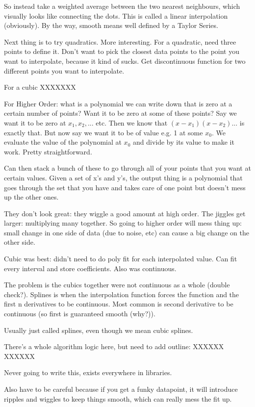\documentclass[12pt]{article}
\begin{document}
So instead take a weighted average between the two nearest neighbours, which visually looks like connecting the dots.
This is called a linear interpolation (obviously).
By the way, smooth means well defined by a Taylor Series.

Next thing is to try quadratics. More interesting.
For a quadratic, need three points to define it. Don't want to pick the closest data points to the point you want to interpolate, because it kind of sucks.
Get discontinuous function for two different points you want to interpolate.

For a cubic XXXXXXX


For Higher Order: what is a polynomial we can write down that is zero at a certain number of points?
Want it to be zero at some of these points? Say we want it to be zero at ${x_1, x_2,...}$ etc.
Then we know that $(x-x_1)(x-x_2)...$ is exactly that.
But now say we want it to be of value e.g. 1 at some $x_0$. We evaluate the value of the polynomial at $x_0$
and divide by its value to make it work. Pretty straightforward.

Can then stack a bunch of these to go through all of your points that you want at certain values.
Given a set of x's and y's, the output thing is a polynomial that goes through the set that you have
and takes care of one point but doesn't mess up the other ones. 

They don't look great: they wiggle a good amount at high order. The jiggles get larger: multiplying many together.
So going to higher order will mess thing up: small change in one side of data (due to noise, etc)
can cause a big change on the other side. 


Cubic was best: didn't need to do poly fit for each interpolated value. Can fit every interval and store coefficients.
Also was continuous.

The problem is the cubics together were not continuous as a whole (double check?). 
Splines is when the interpolation function forces the function and the first n derivatives to be continuous.
Most common is second derivative to be continuous (so first is guaranteed smooth (why?)).

Usually just called splines, even though we mean cubic splines.

There's a whole algorithm logic here, but need to add outline:
XXXXXX
XXXXXX

Never going to write this, exists everywhere in libraries. 

Also have to be careful because if you get a funky datapoint, it will introduce ripples and wiggles 
to keep things smooth, which can really mess the fit up. 
\end{document}
